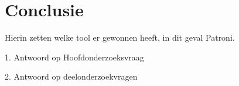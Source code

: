 
\chapter{Conclusie}

\label{ch:conclusie}

Hierin zetten welke tool er gewonnen heeft, in dit geval Patroni.

1. Antwoord op Hoofdonderzoeksvraag

2. Antwoord op deelonderzoekvragen



